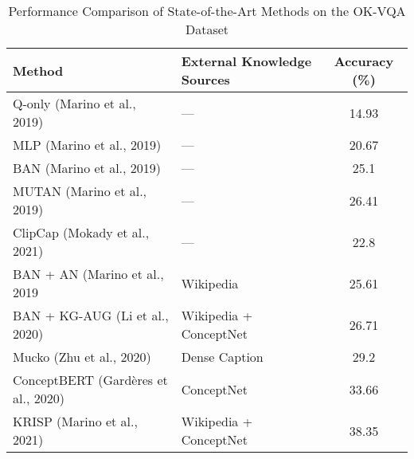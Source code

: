 \begin{table*}[t]
    \centering
    \footnotesize
    \caption{Performance Comparison of State-of-the-Art Methods on the OK-VQA Dataset}
    \label{tab:okvqa_results}
    \renewcommand{\arraystretch}{1.2}
    \setlength{\tabcolsep}{10pt}
    \begin{tabular}{l l c}
        \toprule
        \textbf{Method}                                & \textbf{External Knowledge Sources}                          & \textbf{Accuracy (\%)} \\
        \midrule
        Q-only (Marino et al., 2019)~\cite{marino2019ok}                  & —                                                          & 14.93                  \\
        MLP (Marino et al., 2019)~\cite{marino2019ok}                     & —                                                          & 20.67                  \\
        BAN (Marino et al., 2019)~\cite{marino2019ok}              & —                                                          & 25.1                  \\
        MUTAN (Marino et al., 2019)~\cite{marino2019ok}               & —                                                          & 26.41                  \\
        ClipCap (Mokady et al., 2021)~\cite{mokady2021clipcap}                 & —                                                          & 22.8                   \\
        \midrule
        BAN + AN (Marino et al., 2019~\cite{marino2019ok}                  & Wikipedia                                                  & 25.61                  \\
        BAN + KG-AUG (Li et al., 2020)~\cite{li2020boosting}        & Wikipedia + ConceptNet                                     & 26.71                  \\
        Mucko (Zhu et al., 2020)~\cite{zhu2020mucko}                      & Dense Caption                                              & 29.2                   \\
        ConceptBERT (Gardères et al., 2020)~\cite{garderes2020conceptbert}           & ConceptNet                                                 & 33.66                  \\
        KRISP (Marino et al., 2021)~\cite{marino2021krisp}                   & Wikipedia + ConceptNet                                     & 38.35                  \\

\end{tabular}
\end{table*}
